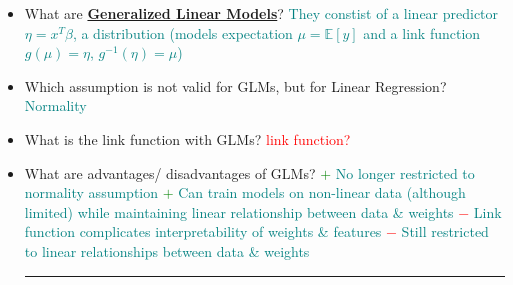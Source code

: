 \documentclass{report}
\newcommand{\asw}[2][teal]{}
\renewcommand{\asw}[2][teal]{\textcolor{#1}{#2}}
\newcommand{\qst}[2][red]{\textcolor{#1}{#2}}
\begin{document}
\begin{itemize}
	\item What are \textbf{\underline{Generalized Linear Models}}?
	\asw{\newline They constist of a linear predictor $\eta = x^T \beta$, a distribution (models expectation $\mu = \mathbb{E}[y]$ and a link function $g(\mu) = \eta$, $g^{-1}(\eta) = \mu$)}
	\item Which assumption is not valid for GLMs, but for Linear Regression?
	\asw{\newline Normality}
	\item What is the link function with GLMs?
	\asw{\newline \qst{link function?}}
	\item What are advantages/ disadvantages of GLMs?
	\asw{\newline \textcolor{green}{$+$} No longer restricted to normality assumption
		\newline \textcolor{green}{$+$} Can train models on non-linear data (although limited) while maintaining linear relationship between data \& weights
		\newline \textcolor{red}{$-$} Link function complicates interpretability of weights \& features
		\newline \textcolor{red}{$-$} Still restricted to linear relationships between data \& weights}
	\newline
	\hrule 
	

\end{itemize}
\end{document}
